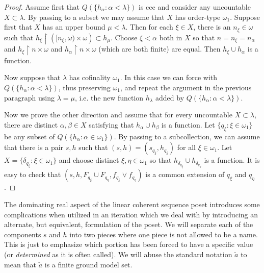 \documentclass{amsart}
\theoremstyle{definition}
\theoremstyle{remark}
\begin{document}
\begin{proof}
Assume first that $Q(\{h_\alpha : \alpha < \lambda\})$ is ccc
and consider any uncountable $X\subset \lambda$. 
 By passing to a subset we may assume that $X$ has order-type
 $\omega_1$. Suppose first that $X$ has an upper bound
 $\mu<\lambda$. Then for each $\xi\in X$, there is an $n_\xi\in\omega$
 such that $h_\xi\restriction \left([n_\xi,\omega)\times\omega\right)\subset
  h_\mu$. Choose $\xi<\alpha$ both in $X$ so that
   $n = n_\xi = n_\alpha$ and $h_\xi\restriction n\times \omega$
   and $h_\alpha\restriction n\times\omega$ (which are both finite)
   are equal. Then $h_\xi\cup h_\alpha$ is a function.

Now suppose that $\lambda$ has cofinality $\omega_1$. In this
case we can force with $Q(\{h_\alpha : \alpha<\lambda\})$,
thus preserving $\omega_1$,
and repeat the argument in the previous paragraph using
 $\lambda=\mu$, i.e.  the new function $h_\lambda$ added
 by $Q(\{h_\alpha : \alpha<\lambda\})$.
 \medskip

  Now we prove the other direction and assume
  that for every uncountable $X\subset\lambda$,
  there are distinct $\alpha,\beta\in X$ satisfying
  that $h_\alpha\cup h_\beta$ is a function.
  Let $\{ q_\xi : \xi\in\omega_1\}$ be any subset
  of $Q(\{h_\alpha : \alpha\in\omega_1\})$. 
 By passing to a subcollection, we can 
 assume that there is a pair $s,h$ such
 that $(s,h) = (s_{q_\xi},h_{q_\xi})$ for
 all $\xi\in\omega_1$.
  Let $X  = \{ \delta_{q_\xi} : \xi\in\omega_1\}$
  and choose distinct $\xi,\eta\in\omega_1$ so
  that $h_{\delta_{q_\xi}}\cup h_{\delta_{q_\eta}}$ is a 
  function. It is easy to check
  that $(s, h, F_{q_\xi}\cup F_{q_\eta}, f_{q_\xi}\vee f_{q_\eta})$
  is a common extension of $q_\xi$ and $q_\eta$.
\end{proof}



The dominating real aspect of the linear coherent sequence poset
introduces some complications when utilized in an iteration
which we deal with by introducing
an alternate, but equivalent, formulation of the poset. We will
separate   each of the components $s$ and $h$ into two pieces where  one
piece is not allowed to be a  name. This is just to emphasize which
portion has been forced to have a specific value (or \textit{determined\/}
as it is often called).
We will abuse the standard
notation $\check{a}$  to mean that $\check{a}$ is a finite ground model set.
\end{document}
